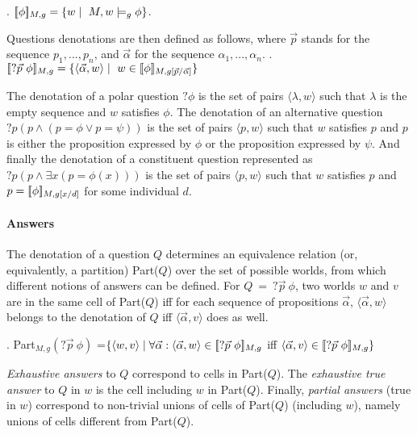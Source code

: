 \ex. \label{prop} $\lin  \phi\rin_{M,g} = \{   w  \mid  \ M,w   \models_{g} \phi \}$. 
 
Questions denotations are then defined as follows, where
 $\vec{p}$ stands for the sequence $p_1,...,p_n$, and  $\vec{\alpha}$ for  the sequence $\alpha_1,...,\alpha_n$.  
\ex. \label{qden} $\lbrack\!\lbrack? \vec{p} \ \phi\rbrack\!\rbrack_{M,g} = \{ \langle \vec{\alpha}, w\rangle \mid  \ w \in  \lbrack\!\lbrack  \phi\rbrack\!\rbrack_{M,g[\vec{p} / \vec{\alpha}  ]}  \}$ 
 
 
  
\noindent The denotation of a  polar question $?  \phi$ is the set of pairs $\langle  \lambda, w \rangle$ such that $\lambda$ is the empty sequence and $w$ satisfies $ \phi$.
 The denotation of an alternative question $?p (p \wedge    (p=\phi \vee p=\psi))$ is the set of pairs $\langle  p, w \rangle$ such that $w$ satisfies $p$ and  $p$ is either the proposition expressed by $ \phi $ or  the proposition expressed by $  \psi $. And finally the denotation of a constituent question represented as  $ ?p ( p \wedge \exists x (p=\phi(x)) )$ is the set of pairs $\langle  p, w \rangle$ such that $w$ satisfies $p$ and $p=\lbrack\!\lbrack \phi\rbrack\!\rbrack_{M,g[x/d]} $ for some individual $d$. 

    
  
\paragraph{Answers} The denotation   of a question  $Q$ determines
an equivalence relation (or, equivalently, a partition) Part($Q$)
over the set of possible worlds, from which different notions of
answers can be defined. For $Q \ = \ ?\vec{p}  \ \phi$, two worlds $w$ and $v$ are in the same
cell of Part($Q$) iff for each sequence of propositions $\vec{\alpha}$, $\langle \vec{\alpha}, w\rangle $   belongs to    the denotation of $Q$  iff $\langle \vec{\alpha}, v\rangle $ does as well. 

\ex. Part$_{M,g}(?\vec{p}  \ \phi)$ =$\{\langle  w,v\rangle \mid  \forall \vec{\alpha}:      \langle \vec{\alpha}, w \rangle \in  \lin?\vec{p} \ \phi\rin_{M,g} $ iff  $ \langle \vec{\alpha} , v \rangle \in  \lbrack\!\lbrack ?\vec{p} \ \phi\rbrack\!\rbrack_{M,g} \}$  
 

\noindent \emph{Exhaustive answers} to $Q$ correspond to cells in
Part($Q$). The \emph{exhaustive true answer} to $Q$ in $w$ is the
cell including $w$ in Part($Q$). Finally, \emph{partial answers}
(true in $w$) correspond to non-trivial unions of cells of
Part($Q$) (including $w$), namely unions of cells different from
Part($Q$).


